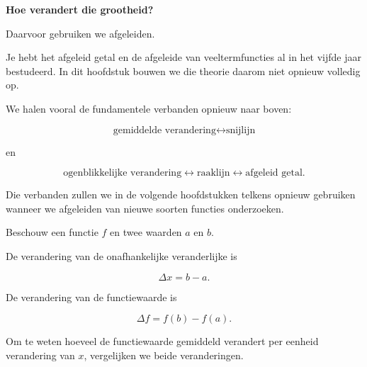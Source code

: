 \documentclass{ximera}
\begin{document}
\begin{center}
\textbf{Hoe verandert die grootheid?}
\end{center}

Daarvoor gebruiken we afgeleiden.

Je hebt het afgeleid getal en de afgeleide van veeltermfuncties
al in het vijfde jaar bestudeerd. In dit hoofdstuk bouwen we die
theorie daarom niet opnieuw volledig op.

We halen vooral de fundamentele verbanden opnieuw naar boven:

\[
\boxed{\text{gemiddelde verandering}}
\longleftrightarrow
\boxed{\text{snijlijn}}
\]

en

\[
\boxed{\text{ogenblikkelijke verandering}}
\longleftrightarrow
\boxed{\text{raaklijn}}
\longleftrightarrow
\boxed{\text{afgeleid getal}}.
\]

Die verbanden zullen we in de volgende hoofdstukken telkens opnieuw
gebruiken wanneer we afgeleiden van nieuwe soorten functies onderzoeken.







Beschouw een functie $f$ en twee waarden $a$ en $b$.

De verandering van de onafhankelijke veranderlijke is

\[
\Delta x=b-a.
\]

De verandering van de functiewaarde is

\[
\Delta f=f(b)-f(a).
\]

Om te weten hoeveel de functiewaarde gemiddeld verandert per
eenheid verandering van $x$, vergelijken we beide veranderingen.
\end{document}
